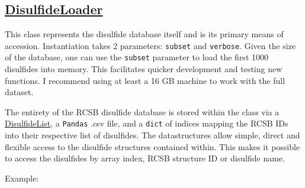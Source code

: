 \hypertarget{disulfideloader}{%
\subsection{\texorpdfstring{\href{https://suchanek.github.io/proteusPy/proteusPy/DisulfideLoader.html}{DisulfideLoader}}{DisulfideLoader}}\label{disulfideloader}}

This class represents the disulfide database itself and is its primary
means of accession. Instantiation takes 2 parameters: \texttt{subset}
and \texttt{verbose}. Given the size of the database, one can use the
\texttt{subset} parameter to load the first 1000 disulfides into memory.
This facilitates quicker development and testing new functions. I
recommend using at least a 16 GB machine to work with the full dataset.

The entirety of the RCSB disulfide database is stored within the class
via a
\href{\%22https://suchanek.github.io/proteusPy/proteusPy/DisulfideList.html\%22}{DisulfideList},
a \texttt{Pandas} .csv file, and a \texttt{dict} of indices mapping the
RCSB IDs into their respective list of disulfides. The datastructures
allow simple, direct and flexible access to the disulfide structures
contained within. This makes it possible to access the disulfides by
array index, RCSB structure ID or disulfide name.

Example:

